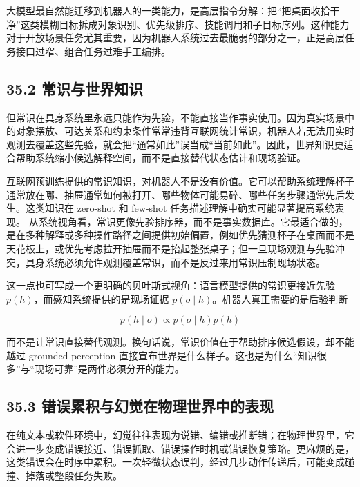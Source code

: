大模型最自然能迁移到机器人的一类能力，是高层指令分解：把“把桌面收拾干净”这类模糊目标拆成对象识别、优先级排序、技能调用和子目标序列。这种能力对于开放场景任务尤其重要，因为机器人系统过去最脆弱的部分之一，正是高层任务接口过窄、组合任务过难手工编排。

\subsection*{35.2 常识与世界知识}


但常识在具身系统里永远只能作为先验，不能直接当作事实使用。因为真实场景中的对象摆放、可达关系和约束条件常常违背互联网统计常识，机器人若无法用实时观测去覆盖这些先验，就会把“通常如此”误当成“当前如此”。因此，世界知识更适合帮助系统缩小候选解释空间，而不是直接替代状态估计和现场验证。

互联网预训练提供的常识知识，对机器人不是没有价值。它可以帮助系统理解杯子通常放在哪、抽屉通常如何被打开、哪些物体可能易碎、哪些任务步骤通常先后发生。这类知识在 zero-shot 和 few-shot 任务描述理解中确实可能显著提高系统表现。 从系统视角看，常识更像先验排序器，而不是事实数据库。它最适合做的，是在多种解释或多种操作路径之间提供初始偏置，例如优先猜测杯子在桌面而不是天花板上，或优先考虑拉开抽屉而不是抬起整张桌子；但一旦现场观测与先验冲突，具身系统必须允许观测覆盖常识，而不是反过来用常识压制现场状态。

这一点也可写成一个更明确的贝叶斯式视角：语言模型提供的常识更接近先验 \(p(h)\)，而感知系统提供的是现场证据 \(p(o \mid h)\)。机器人真正需要的是后验判断

\begin{equation*}
p(h \mid o) \propto p(o \mid h)p(h)
\end{equation*}

而不是让常识直接替代观测。换句话说，常识价值在于帮助排序候选假设，却不能越过 grounded perception 直接宣布世界是什么样子。这也是为什么“知识很多”与“现场可靠”是两件必须分开的能力。

\subsection*{35.3 错误累积与幻觉在物理世界中的表现}


在纯文本或软件环境中，幻觉往往表现为说错、编错或推断错；在物理世界里，它会进一步变成错误接近、错误抓取、错误操作时机或错误恢复策略。更麻烦的是，这类错误会在时序中累积。一次轻微状态误判，经过几步动作传递后，可能变成碰撞、掉落或整段任务失败。

